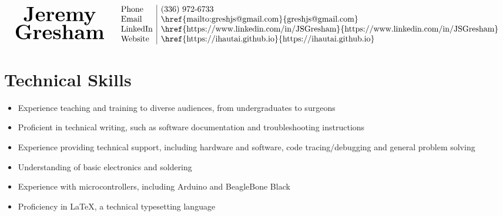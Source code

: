 \documentclass[10pt]{article}
\begin{document}
\begin{center}
  \[
\begin{array}{lr}
\begin{array}{cr}
\mbox{\bf\Huge Jeremy} \\
\mbox{\bf\Huge Gresham}
\end{array} &
\begin{array}{l|l}
\setlength{\arraycolsep}{1pt}
\mbox{Phone} & $(336) 972-6733$ \\
\mbox{Email} & $\href{mailto:greshjs@gmail.com}{greshjs@gmail.com}$ \\
\mbox{LinkedIn} & $\href{https://www.linkedin.com/in/JSGresham}{https://www.linkedin.com/in/JSGresham}$ \\
\mbox{Website} & $\href{https://ihautai.github.io}{https://ihautai.github.io}$ \\
\end{array}
\end{array}
\]

\end{center}


\section*{Technical Skills}

\begin{itemize}\raggedright
\setlength{\itemsep}{0pt}
\item Experience teaching and training to diverse audiences, from undergraduates to surgeons

\item Proficient in technical writing, such as software documentation and troubleshooting instructions

\item Experience providing technical support, including hardware and software, code tracing/debugging and general problem solving

\item Understanding of basic electronics and soldering

\item Experience with microcontrollers, including Arduino and BeagleBone Black

\item Proficiency in {\rmfamily \LaTeX}, a technical typesetting language
  
\end{itemize}
\end{document}
